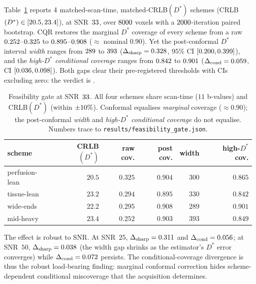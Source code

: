 \documentclass[11pt]{article}
\newcommand{\Dstar}{D^{*}}
\begin{document}
Table~\ref{tab:gate} reports $4$ matched-scan-time, matched-CRLB$(\Dstar)$
schemes (CRLB$(\Dstar)\in[\numCrlbMin,\numCrlbMax]$), at SNR~$33$, over
$8000$ voxels with a $2000$-iteration paired bootstrap. CQR restores the
marginal $\Dstar$ coverage of every scheme from a raw $0.252$--$0.325$ to
$0.895$--$0.908$ ($\approx$ nominal $0.90$). Yet the post-conformal
$\Dstar$ interval \emph{width} ranges from $289$ to $393$
($\Delta_{\mathrm{sharp}}=0.328$, $95\%$ CI
$[0.200,0.399]$), and the \emph{high-$\Dstar$ conditional
coverage} ranges from $0.842$ to $0.901$
($\Delta_{\mathrm{cond}}=0.059$, CI $[0.036,0.098]$). Both
gaps clear their pre-registered thresholds with CIs excluding zero: the verdict is
\textbf{\numVerdict}.

\begin{table}[t]
\centering
\small
\begin{tabular}{lrrrrr}
\toprule
scheme & CRLB$(\Dstar)$ & raw cov. & post cov. & width & high-$\Dstar$ cov. \\
\midrule
perfusion-lean & $20.5$ & $0.325$ & $0.904$ & $300$ & $0.865$ \\
tissue-lean    & $23.2$ & $0.294$ & $0.895$ & $330$ & $0.842$ \\
wide-ends      & $22.2$ & $0.295$ & $0.908$ & $289$ & $0.901$ \\
mid-heavy      & $23.4$ & $0.252$ & $0.903$ & $393$ & $0.849$ \\
\bottomrule
\end{tabular}
\caption{Feasibility gate at SNR~$33$. All four schemes share scan-time
($11$ b-values) and CRLB$(\Dstar)$ (within $\pm10\%$). Conformal equalises
\emph{marginal} coverage ($\approx0.90$); the post-conformal \emph{width} and
\emph{high-$\Dstar$ conditional coverage} do not equalise. Numbers trace to
\texttt{results/feasibility\_gate.json}.}
\label{tab:gate}
\end{table}

The effect is robust to SNR. At SNR~$25$, $\Delta_{\mathrm{sharp}}=0.311$
and $\Delta_{\mathrm{cond}}=0.056$; at SNR~$50$,
$\Delta_{\mathrm{sharp}}=0.038$ (the width gap shrinks as the estimator's
$\Dstar$ error converges) while $\Delta_{\mathrm{cond}}=0.072$ persists.
The conditional-coverage divergence is thus the robust load-bearing finding: marginal
conformal correction hides scheme-dependent conditional miscoverage that the
acquisition determines.
\end{document}
